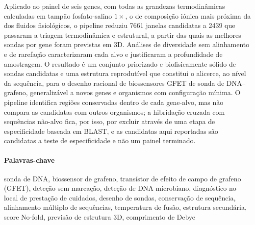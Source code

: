 Aplicado ao painel de seis genes, com todas as grandezas termodinâmicas calculadas em tampão
fosfato-salino $1\times$, o de composição iónica mais próxima da dos fluidos fisiológicos, o pipeline
reduziu 7661 janelas candidatas a 2439 que passaram a triagem termodinâmica e estrutural, a partir das
quais as melhores sondas por gene foram previstas em 3D. Análises de diversidade sem alinhamento e de rarefação
caracterizaram cada alvo e justificaram a profundidade de amostragem. O resultado é um conjunto
priorizado e biofisicamente sólido de sondas candidatas e uma estrutura reprodutível que constitui o
alicerce, ao nível da sequência, para o desenho racional de biossensores GFET de sonda de
DNA--grafeno,
generalizável a novos genes e organismos com configuração mínima. O pipeline identifica regiões
conservadas dentro de cada gene-alvo, mas não compara as candidatas com outros organismos; a
hibridação cruzada com sequências não-alvo fica, por isso, por excluir através de uma etapa de
especificidade baseada em BLAST, e as candidatas aqui reportadas são candidatas a teste de
especificidade e não um painel terminado.

\paragraph{Palavras-chave} sonda de DNA, biossensor de grafeno, transístor de
efeito de campo de grafeno (GFET), deteção sem marcação, deteção de DNA microbiano, diagnóstico no
local de prestação de cuidados, desenho de sondas, conservação de sequência, alinhamento múltiplo
de sequências, temperatura de fusão, estrutura secundária, score No-fold,
previsão de estrutura 3D, comprimento de Debye

\cleardoublepage
